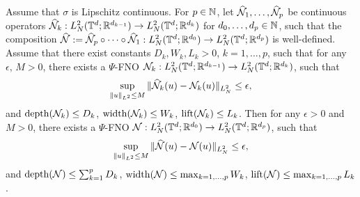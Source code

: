 \documentclass[reqno,a4paper]{amsart}
\begin{document}
\begin{lemma}  \label{lem:replacement}
Assume that $\sigma$ is Lipschitz continuous. For $p\in \mathbb{N}$, let $\widehat{\mathcal{N}}_1,\dots, \widehat{\mathcal{N}}_p$ be continuous operators $\widehat{\mathcal{N}}_k: L^2_N(\mathbb{T}^d; \mathbb{R}^{d_{k-1}}) \to L^2_N(\mathbb{T}^d;\mathbb{R}^{d_{k}})$ for $d_0,\dots, d_p \in \mathbb{N}$, such that the composition $\widehat{\mathcal{N}} := \widehat{\mathcal{N}}_p\circ \dots \circ\widehat{\mathcal{N}}_1: L^2_N(\mathbb{T}^d;\mathbb{R}^{d_0}) \to L^2_N(\mathbb{T}^d;\mathbb{R}^{d_p})$ is well-defined. Assume that there exist constants $D_k, W_k, L_k>0$, $k=1,\dots, p$, such that for any $\epsilon, \, M > 0$, there exists a $\Psi$-FNO $\mathcal{N}_k: L^2_N(\mathbb{T}^d;\mathbb{R}^{d_{k-1}}) \to L^2_N(\mathbb{T}^d;\mathbb{R}^{d_{k}})$, such that 
\[
\sup_{\Vert u \Vert_{L^2}\le M} \Vert \widehat{\mathcal{N}}_k(u) - \mathcal{N}_k(u) \Vert_{L^2_N} \le \epsilon,
\]
and $\mathrm{depth}(\mathcal{N}_k) \le D_k$, $\mathrm{width}(\mathcal{N}_k) \le W_k$, $\mathrm{lift}(\mathcal{N}_k) \le L_k$. Then for any $\epsilon>0$ and $M>0$, there exists a $\Psi$-FNO $\mathcal{N}: L^2_N(\mathbb{T}^d;\mathbb{R}^{d_0}) \to L^2_N(\mathbb{T}^d;\mathbb{R}^{d_p})$, such that 
\[
\sup_{\Vert u \Vert_{L^2}\le M} \Vert \widehat{\mathcal{N}}(u) - \mathcal{N}(u) \Vert_{L^2_N} \le \epsilon,
\]
and $\mathrm{depth}(\mathcal{N}) \le \sum_{k=1}^p D_k$, $\mathrm{width}(\mathcal{N}) \le \max_{k=1,\dots,p} W_k$, $\mathrm{lift}(\mathcal{N}) \le \max_{k=1,\dots, p} L_k$.
\end{lemma}
\end{document}
